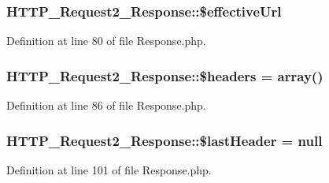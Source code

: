 \hypertarget{classHTTP__Request2__Response_ab87ff3f614066accc95a6f29f23bc051}{
\subsubsection[{\$effective\-Url}]{\setlength{\rightskip}{0pt plus 5cm}H\-T\-T\-P\-\_\-\-Request2\-\_\-\-Response\-::\$effective\-Url\hspace{0.3cm}{\ttfamily [protected]}}}\label{classHTTP__Request2__Response_ab87ff3f614066accc95a6f29f23bc051}


Definition at line 80 of file Response.\-php.

\hypertarget{classHTTP__Request2__Response_a17017d7d7f6452267ba57ecd0e10fa35}{
\subsubsection[{\$headers}]{\setlength{\rightskip}{0pt plus 5cm}H\-T\-T\-P\-\_\-\-Request2\-\_\-\-Response\-::\$headers = array()\hspace{0.3cm}{\ttfamily [protected]}}}\label{classHTTP__Request2__Response_a17017d7d7f6452267ba57ecd0e10fa35}


Definition at line 86 of file Response.\-php.

\hypertarget{classHTTP__Request2__Response_adcf7a1e02f6e5d9eac767466f8551a1e}{
\subsubsection[{\$last\-Header}]{\setlength{\rightskip}{0pt plus 5cm}H\-T\-T\-P\-\_\-\-Request2\-\_\-\-Response\-::\$last\-Header = null\hspace{0.3cm}{\ttfamily [protected]}}}\label{classHTTP__Request2__Response_adcf7a1e02f6e5d9eac767466f8551a1e}


Definition at line 101 of file Response.\-php.

